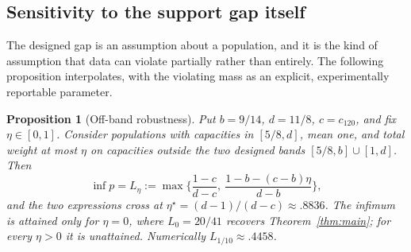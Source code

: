 \documentclass[11pt]{article}
\newtheorem{proposition}[theorem]{Proposition}
\theoremstyle{definition}
\begin{document}
\subsection{Sensitivity to the support gap itself}
The designed gap is an assumption about a population, and it is the kind of
assumption that data can violate partially rather than entirely. The following
proposition interpolates, with the violating mass as an explicit,
experimentally reportable parameter.

\begin{proposition}[Off-band robustness]\label{prop:offband}
Put $b=9/14$, $d=11/8$, $c=c_{120}$, and fix $\eta\in[0,1]$. Consider
populations with capacities in $[5/8,d]$, mean one, and total weight at most
$\eta$ on capacities outside the two designed bands
$[5/8,b]\cup[1,d]$. Then
\begin{equation}\label{eq:offband}
  \inf p=L_\eta:=\max\Big\{\frac{1-c}{d-c},\
  \frac{1-b-(c-b)\eta}{d-b}\Big\},
\end{equation}
and the two expressions cross at $\eta^\star=(d-1)/(d-c)\approx.8836$. The
infimum is attained only for $\eta=0$, where $L_0=20/41$ recovers
Theorem~\ref{thm:main}; for every $\eta>0$ it is unattained. Numerically
$L_{1/10}\approx.4458$.
\end{proposition}
\end{document}
